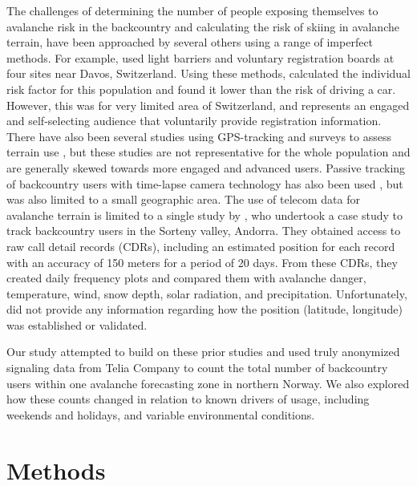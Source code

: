 \documentclass[authordate,empirical, issue]{jote-new-article}
\begin{document}
The challenges of determining the number of people exposing themselves to avalanche risk in the backcountry and calculating the risk of skiing in avalanche terrain, have been approached by several others using a range of imperfect methods. For example, \textcite{Zweifel2006} used light barriers and voluntary registration boards at four sites near Davos, Switzerland. Using these methods, \textcite{Zweifel2006} calculated the individual risk factor for this population and found it lower than the risk of driving a car. However, this was for very limited area of Switzerland, and represents an engaged and self-selecting audience that voluntarily provide registration information. There have also been several studies using GPS-tracking and surveys to assess terrain use \parencites{Buhler2016}{Hendrikx2014}{Hendrikx2016}{Sykes2020}{Thumlert2017}{Winkler2021}, but these studies are not representative for the whole population and are generally skewed towards more engaged and advanced users. Passive tracking of backcountry users with time-lapse camera technology has also been used \parencites{Saly2020}, but was also limited to a small geographic area. The use of telecom data for avalanche terrain is limited to a single study by \textcite{Francisco2018}, who undertook a case study to track backcountry users in the Sorteny valley, Andorra. They obtained access to raw call detail records (CDRs), including an estimated position for each record with an accuracy of 150 meters for a period of 20 days. From these CDRs, they created daily frequency plots and compared them with avalanche danger, temperature, wind, snow depth, solar radiation, and precipitation. Unfortunately, \textcite{Francisco2018} did not provide any information regarding how the position (latitude, longitude) was established or validated.



Our study attempted to build on these prior studies and used truly anonymized signaling data from Telia Company to count the total number of backcountry users within one avalanche forecasting zone in northern Norway. We also explored how these counts changed in relation to known drivers of usage, including weekends and holidays, and variable environmental conditions.







\section{Methods}
\end{document}
